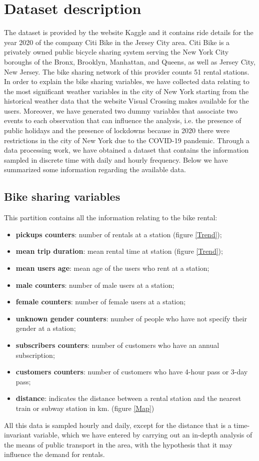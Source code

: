 \section{Dataset description}
The dataset is provided by the website Kaggle and it contains ride details for the year \num{2020} of the company Citi Bike in the Jersey City area. Citi Bike is a privately owned public bicycle sharing system serving the New York City boroughs of the Bronx, Brooklyn, Manhattan, and Queens, as well as Jersey City, New Jersey. The bike sharing network of this provider counts \num{51} rental stations. In order to explain the bike sharing variables, we have collected data relating to the most significant weather variables in the city of New York starting from the historical weather data that the website Visual Crossing makes available for the users. Moreover, we have generated two dummy variables that associate two events to each observation that can influence the analysis, i.e. the presence of public holidays and the presence of lockdowns because in \num{2020} there were restrictions in the city of New York due to the COVID-\num{19} pandemic.
Through a data processing work, we have obtained a dataset that contains the information sampled in discrete time with daily and hourly frequency. Below we have summarized some information regarding the available data.

\subsection{Bike sharing variables}
This partition contains all the information relating to the bike rental:
\begin{itemize}
	\item \textbf{pickups counters}: number of rentals at a station (figure \ref{Trend});
	\item \textbf{mean trip duration}: mean rental time at station (figure \ref{Trend});
	\item \textbf{mean users age}: mean age of the users who rent at a station;
	\item \textbf{male counters}: number of male users at a station;
	\item \textbf{female counters}: number of female users at a station;
	\item \textbf{unknown gender counters}: number of people who have not specify their gender at a station;
	\item \textbf{subscribers counters}: number of customers who have an annual subscription;
	\item \textbf{customers counters}: number of customers who have \num{4}-hour pass or \num{3}-day pass;
	\item \textbf{distance}: indicates the distance between a rental station and the nearest train or subway station in \unit{\kilo\meter}. (figure \ref{Map})
	
\end{itemize}
All this data is sampled hourly and daily, except for the distance that is a time-invariant variable, which we have entered by carrying out an in-depth analysis of the means of public transport in the area, with the hypothesis that it may influence the demand for rentals.

